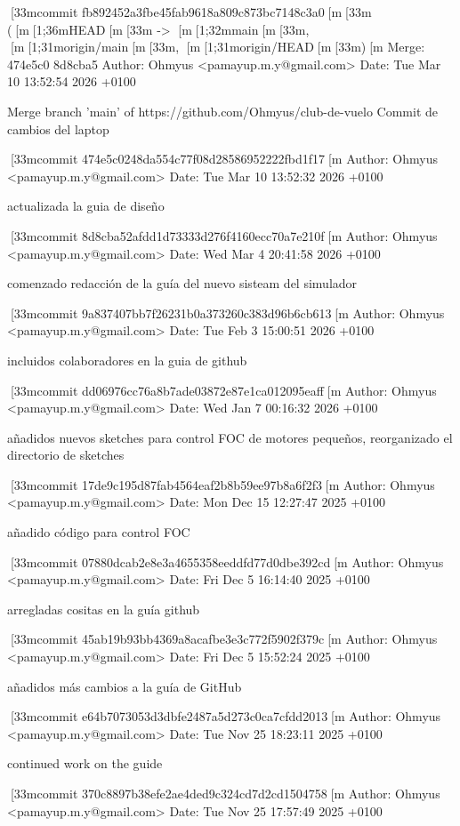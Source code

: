 [33mcommit fb892452a3fbe45fab9618a809c873bc7148c3a0[m[33m ([m[1;36mHEAD[m[33m -> [m[1;32mmain[m[33m, [m[1;31morigin/main[m[33m, [m[1;31morigin/HEAD[m[33m)[m
Merge: 474e5c0 8d8cba5
Author: Ohmyus <pamayup.m.y@gmail.com>
Date:   Tue Mar 10 13:52:54 2026 +0100

    Merge branch 'main' of https://github.com/Ohmyus/club-de-vuelo
    Commit de cambios del laptop

[33mcommit 474e5c0248da554c77f08d28586952222fbd1f17[m
Author: Ohmyus <pamayup.m.y@gmail.com>
Date:   Tue Mar 10 13:52:32 2026 +0100

    actualizada la guia de diseño

[33mcommit 8d8cba52afdd1d73333d276f4160ecc70a7e210f[m
Author: Ohmyus <pamayup.m.y@gmail.com>
Date:   Wed Mar 4 20:41:58 2026 +0100

    comenzado redacción de la guía del nuevo sisteam del simulador

[33mcommit 9a837407bb7f26231b0a373260c383d96b6cb613[m
Author: Ohmyus <pamayup.m.y@gmail.com>
Date:   Tue Feb 3 15:00:51 2026 +0100

    incluidos colaboradores en la guia de github

[33mcommit dd06976cc76a8b7ade03872e87e1ca012095eaff[m
Author: Ohmyus <pamayup.m.y@gmail.com>
Date:   Wed Jan 7 00:16:32 2026 +0100

    añadidos nuevos sketches para control FOC de motores pequeños, reorganizado el directorio de sketches

[33mcommit 17de9c195d87fab4564eaf2b8b59ee97b8a6f2f3[m
Author: Ohmyus <pamayup.m.y@gmail.com>
Date:   Mon Dec 15 12:27:47 2025 +0100

    añadido código para control FOC

[33mcommit 07880dcab2e8e3a4655358eeddfd77d0dbe392cd[m
Author: Ohmyus <pamayup.m.y@gmail.com>
Date:   Fri Dec 5 16:14:40 2025 +0100

    arregladas cositas en la guía github

[33mcommit 45ab19b93bb4369a8acafbe3e3c772f5902f379c[m
Author: Ohmyus <pamayup.m.y@gmail.com>
Date:   Fri Dec 5 15:52:24 2025 +0100

    añadidos más cambios a la guía de GitHub

[33mcommit e64b7073053d3dbfe2487a5d273c0ca7cfdd2013[m
Author: Ohmyus <pamayup.m.y@gmail.com>
Date:   Tue Nov 25 18:23:11 2025 +0100

    continued work on the guide

[33mcommit 370c8897b38efe2ae4ded9c324cd7d2cd1504758[m
Author: Ohmyus <pamayup.m.y@gmail.com>
Date:   Tue Nov 25 17:57:49 2025 +0100

